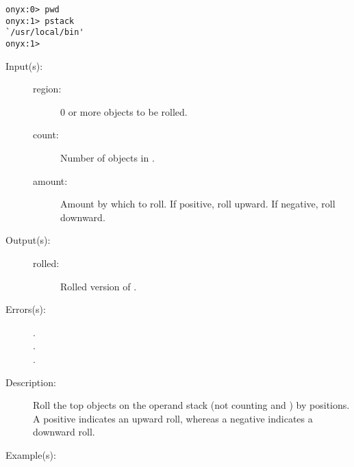 \begin{description}
\begin{description}
\begin{verbatim}
onyx:0> pwd
onyx:1> pstack
`/usr/local/bin'
onyx:1>
		\end{verbatim}
	\end{description}
\label{systemdict:roll}
\item[{\onyxop{region count amount}{roll}{rolled}}: ]
	\begin{description}\item[]
	\item[Input(s): ]
		\begin{description}\item[]
		\item[region: ]
			0 or more objects to be rolled.
		\item[count: ]
			Number of objects in .
		\item[amount: ]
			Amount by which to roll.  If positive, roll
			upward.  If negative, roll downward.
		\end{description}
	\item[Output(s): ]
		\begin{description}\item[]
		\item[rolled: ]
			Rolled version of .
		\end{description}
	\item[Errors(s): ]
		\begin{description}\item[]
		\item[.]
		\item[.]
		\item[.]
		\end{description}
	\item[Description: ]
		Roll the top  objects on the operand stack
		(not counting  and ) by
		 positions.  A positive 
		indicates an upward roll, whereas a negative 
		indicates a downward roll.
	\item[Example(s): ]\begin{verbatim}


\end{verbatim}
\end{description}
\end{description}
